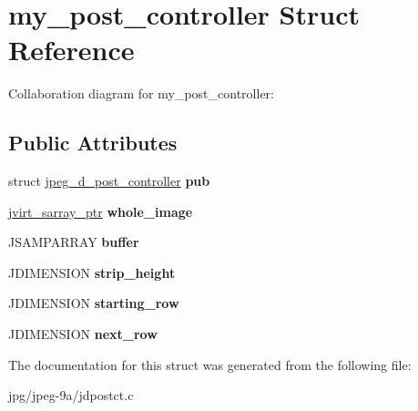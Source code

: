 \hypertarget{structmy__post__controller}{\section{my\+\_\+post\+\_\+controller Struct Reference}
\label{structmy__post__controller}
}


Collaboration diagram for my\+\_\+post\+\_\+controller\+:
\subsection*{Public Attributes}
\begin{DoxyCompactItemize}
\item 
\hypertarget{structmy__post__controller_a4618ce845c38c4c563bdd28af061b727}{struct \hyperlink{structjpeg__d__post__controller}{jpeg\+\_\+d\+\_\+post\+\_\+controller} {\bfseries pub}}\label{structmy__post__controller_a4618ce845c38c4c563bdd28af061b727}

\item 
\hypertarget{structmy__post__controller_ac2336623f2e802993b35b7db30053b68}{\hyperlink{structjvirt__sarray__control}{jvirt\+\_\+sarray\+\_\+ptr} {\bfseries whole\+\_\+image}}\label{structmy__post__controller_ac2336623f2e802993b35b7db30053b68}

\item 
\hypertarget{structmy__post__controller_aa571ce1fd2b5171a40d3b18d1496a2cf}{J\+S\+A\+M\+P\+A\+R\+R\+A\+Y {\bfseries buffer}}\label{structmy__post__controller_aa571ce1fd2b5171a40d3b18d1496a2cf}

\item 
\hypertarget{structmy__post__controller_a50ed0e70f9acab0995bbffb3aef6e9aa}{J\+D\+I\+M\+E\+N\+S\+I\+O\+N {\bfseries strip\+\_\+height}}\label{structmy__post__controller_a50ed0e70f9acab0995bbffb3aef6e9aa}

\item 
\hypertarget{structmy__post__controller_a1e762395815d8f552d1a412cb5201575}{J\+D\+I\+M\+E\+N\+S\+I\+O\+N {\bfseries starting\+\_\+row}}\label{structmy__post__controller_a1e762395815d8f552d1a412cb5201575}

\item 
\hypertarget{structmy__post__controller_a9aa9e3077c24ae10e47972c1955c6d38}{J\+D\+I\+M\+E\+N\+S\+I\+O\+N {\bfseries next\+\_\+row}}\label{structmy__post__controller_a9aa9e3077c24ae10e47972c1955c6d38}

\end{DoxyCompactItemize}


The documentation for this struct was generated from the following file\+:\begin{DoxyCompactItemize}
\item 
jpg/jpeg-\/9a/jdpostct.\+c\end{DoxyCompactItemize}
